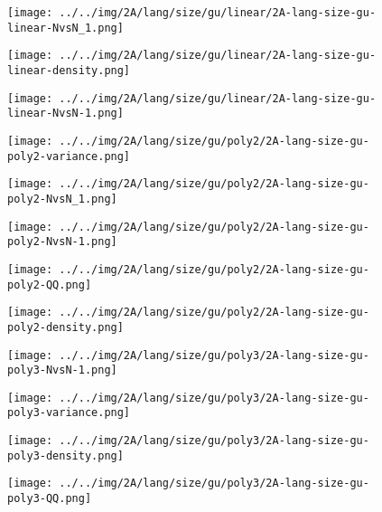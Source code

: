 \begin{figure}[H]
\centering	\texttt{[image: ../../img/2A/lang/size/gu/linear/2A-lang-size-gu-linear-NvsN\_1.png]}
\end{figure}
\begin{figure}[H]
\centering	\texttt{[image: ../../img/2A/lang/size/gu/linear/2A-lang-size-gu-linear-density.png]}
\end{figure}
\begin{figure}[H]
\centering	\texttt{[image: ../../img/2A/lang/size/gu/linear/2A-lang-size-gu-linear-NvsN-1.png]}
\end{figure}
\begin{figure}[H]
\centering	\texttt{[image: ../../img/2A/lang/size/gu/poly2/2A-lang-size-gu-poly2-variance.png]}
\end{figure}
\begin{figure}[H]
\centering	\texttt{[image: ../../img/2A/lang/size/gu/poly2/2A-lang-size-gu-poly2-NvsN\_1.png]}
\end{figure}
\begin{figure}[H]
\centering	\texttt{[image: ../../img/2A/lang/size/gu/poly2/2A-lang-size-gu-poly2-NvsN-1.png]}
\end{figure}
\begin{figure}[H]
\centering	\texttt{[image: ../../img/2A/lang/size/gu/poly2/2A-lang-size-gu-poly2-QQ.png]}
\end{figure}
\begin{figure}[H]
\centering	\texttt{[image: ../../img/2A/lang/size/gu/poly2/2A-lang-size-gu-poly2-density.png]}
\end{figure}
\begin{figure}[H]
\centering	\texttt{[image: ../../img/2A/lang/size/gu/poly3/2A-lang-size-gu-poly3-NvsN-1.png]}
\end{figure}
\begin{figure}[H]
\centering	\texttt{[image: ../../img/2A/lang/size/gu/poly3/2A-lang-size-gu-poly3-variance.png]}
\end{figure}
\begin{figure}[H]
\centering	\texttt{[image: ../../img/2A/lang/size/gu/poly3/2A-lang-size-gu-poly3-density.png]}
\end{figure}
\begin{figure}[H]
\centering	\texttt{[image: ../../img/2A/lang/size/gu/poly3/2A-lang-size-gu-poly3-QQ.png]}
\end{figure}
